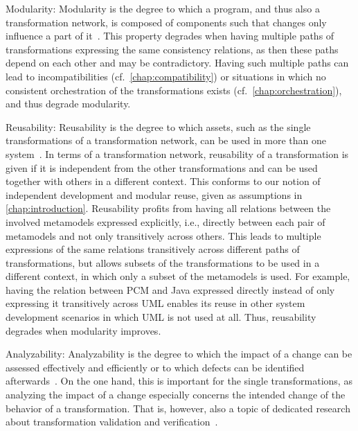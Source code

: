\begin{properdescription}
    \item[Modularity:] 
    Modularity is the degree to which a program, and thus also a transformation network, is composed of components such that changes only influence a part of it~\cite[p.~14]{iso25010}.
    This property degrades when having multiple paths of transformations expressing the same consistency relations, as then these paths depend on each other and may be contradictory. 
    Having such multiple paths can lead to incompatibilities (cf.\ \autoref{chap:compatibility}) or situations in which no consistent orchestration of the transformations exists (cf.\ \autoref{chap:orchestration}), and thus degrade modularity.
    \item[Reusability:]
    Reusability is the degree to which assets, such as the single transformations of a transformation network, can be used in more than one system~\cite[p.~15]{iso25010}.
    In terms of a transformation network, reusability of a transformation is given if it is independent from the other transformations and can be used together with others in a different context.
    This conforms to our notion of independent development and modular reuse, given as assumptions in \autoref{chap:introduction}.
    Reusability profits from having all relations between the involved metamodels expressed explicitly, i.e., directly between each pair of metamodels and not only transitively across others.
    This leads to multiple expressions of the same relations transitively across different paths of transformations, but allows subsets of the transformations to be used in a different context, in which only a subset of the metamodels is used.
    For example, having the relation between \gls{PCM} and Java expressed directly instead of only expressing it transitively across \gls{UML} enables its reuse in other system development scenarios in which \gls{UML} is not used at all.
    Thus, reusability degrades when modularity improves.
    \item[Analyzability:] 
    Analyzability is the degree to which the impact of a change can be assessed effectively and efficiently or to which defects can be identified afterwards~\cite[p.~15]{iso25010}.
    On the one hand, this is important for the single transformations, as analyzing the impact of a change especially concerns the intended change of the behavior of a transformation. That is, however, also a topic of dedicated research about transformation validation and verification~\cite{cabot2010VerificationInvariants-JSS, rahim2015SurveyTransformationVerification-SoSym, azizi2017ContractVerification-ICCKE, vallecillo2012FormalTesting-FMMDE}.

\end{properdescription}
